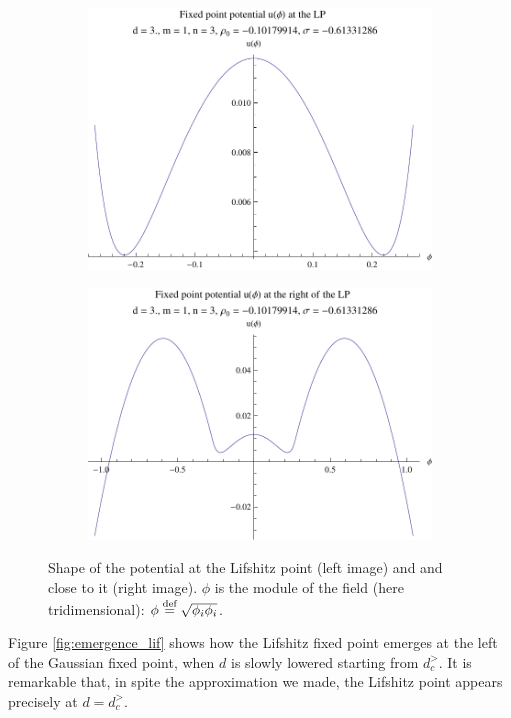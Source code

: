 \begin{figure}[htp]
\centering
\begin{subfigure}{.5\textwidth}
	\centering
	\includegraphics[width=.9\linewidth]{img/chap4/plotfieldd3.pdf}
	\caption{}
	\label{fig:plotfield}
	\end{subfigure}%
\begin{subfigure}{.5\textwidth}
	\centering
	\includegraphics[width=.9\linewidth]{img/chap4/plotfieldrightd3.pdf}
	\caption{}
	\label{fig:plotfieldright}
\end{subfigure}
\caption{Shape of the potential at the Lifshitz point (left image) and and close to it (right image). $\phi$ is the module of the field (here tridimensional): $\phi  \overset{\text{def}}{=}  \sqrt{\phi_i \phi_i}$.}
\label{fig:pot_d3}
\end{figure}

Figure \eqref{fig:emergence_lif} shows how the Lifshitz fixed point emerges at the left of the Gaussian fixed point, when $d$ is slowly lowered starting from $d_c^>$. It is remarkable that, in spite the approximation we made, the Lifshitz point appears precisely at $d = d_c^>$.


